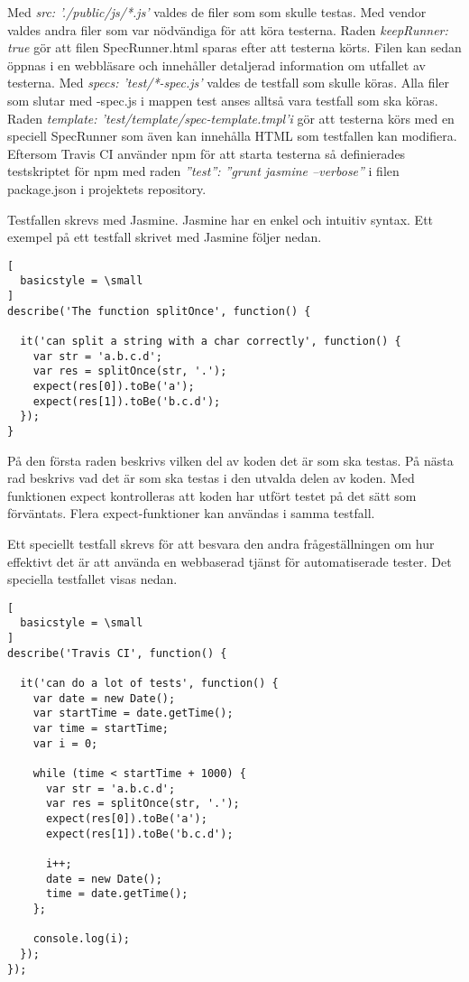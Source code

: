 Med \emph{src: './public/js/*.js'} valdes de filer som som skulle testas.
Med vendor valdes andra filer som var nödvändiga för att köra testerna.
Raden \emph{keepRunner: true} gör att filen \textunderscore SpecRunner.html sparas efter att
testerna körts. Filen kan sedan öppnas i en webbläsare och innehåller
detaljerad information om utfallet av testerna.
Med \emph{specs: 'test/*-spec.js'} valdes de testfall som skulle köras.
Alla filer som slutar med -spec.js i mappen test anses alltså vara
testfall som ska köras.
Raden \emph{template: 'test/template/spec-template.tmpl'i} gör att testerna
körs med en speciell SpecRunner som även kan innehålla HTML som testfallen
kan modifiera.
Eftersom Travis CI använder npm för att starta 
testerna så definierades testskriptet för npm med raden
\emph{''test'': ''grunt jasmine --verbose''} i filen package.json 
i projektets repository.

Testfallen skrevs med Jasmine. Jasmine har en enkel och intuitiv syntax.
Ett exempel på ett testfall skrivet med Jasmine följer nedan.

\begin{lstlisting}[
  basicstyle = \small
]
describe('The function splitOnce', function() {
	
  it('can split a string with a char correctly', function() {
    var str = 'a.b.c.d';
    var res = splitOnce(str, '.');
    expect(res[0]).toBe('a');
    expect(res[1]).toBe('b.c.d');
  });
}
\end{lstlisting}

På den första raden beskrivs vilken del av koden det är som ska testas.
På nästa rad beskrivs vad det är som ska testas i den utvalda delen av koden.
Med funktionen expect kontrolleras att koden har utfört testet på det sätt
som förväntats. Flera expect-funktioner kan användas i samma testfall.

Ett speciellt testfall skrevs
för att besvara den andra frågeställningen om hur effektivt det är 
att använda en webbaserad tjänst
för automatiserade tester. Det speciella testfallet visas nedan.

\begin{lstlisting}[
  basicstyle = \small
]
describe('Travis CI', function() {
	
  it('can do a lot of tests', function() {
    var date = new Date();
    var startTime = date.getTime();
    var time = startTime;
    var i = 0;

    while (time < startTime + 1000) {  
      var str = 'a.b.c.d';
      var res = splitOnce(str, '.');
      expect(res[0]).toBe('a');
      expect(res[1]).toBe('b.c.d');

      i++;
      date = new Date(); 
      time = date.getTime();
    };

    console.log(i);
  });
});
\end{lstlisting}

